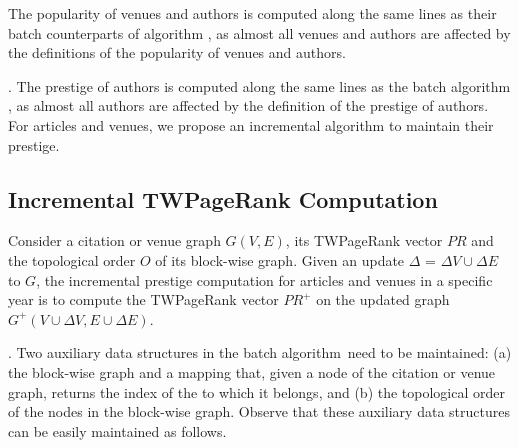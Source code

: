 The popularity of venues and authors is computed along the same lines as their batch counterparts of algorithm \batensemble,
as almost all venues and authors are affected  by the definitions of the popularity of venues and authors.

.
The prestige of authors is computed along the same lines as the batch algorithm \batensemble,
as almost all authors are affected  by the definition of the prestige of authors.
%
For articles and venues, we propose an incremental algorithm to maintain their prestige.







\subsection{Incremental TWPageRank Computation}
\label{subsec-incTWPageRank-computation}





Consider a citation or venue graph $G(V, E)$, its TWPageRank vector $PR$ and the topological order $O$ of its block-wise graph. Given an update $\Delta$ = $\Delta V\cup\Delta E$ to $G$, the incremental prestige computation for articles and venues in a specific year is to compute the TWPageRank vector $PR^+$ on the updated graph $G^+(V\cup\Delta V, E\cup\Delta E)$.


.
Two auxiliary data structures in the batch algorithm~\twprscc need to be maintained: (a) the block-wise graph and  a mapping that, given a node of the citation or venue graph, returns the index of the \scc to which it belongs, and (b) the topological order of the nodes in the block-wise graph.
%
Observe that these auxiliary data structures can be easily maintained as follows.

